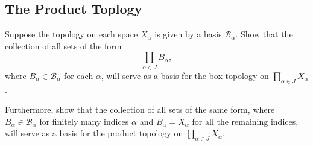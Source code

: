 \subsection{The Product Toplogy}

\begin{exercise}[ID=2.19.1]
    Suppose the topology on each space $X_\alpha$ is given by a basis $\mathscr{B}_\alpha$.
    Show that the collection of all sets of the form
    $$\prod_{\alpha \in J} B_\alpha,$$
    where $B_\alpha \in \mathscr{B}_\alpha$ for each $\alpha$, will serve as a basis for the box topology on $\prod_{\alpha \in J} X_\alpha$.

    Furthermore, show that the collection of all sets of the same form, where $B_\alpha \in \mathscr{B}_\alpha$ for finitely many indices $\alpha$ and $B_\alpha = X_\alpha$ for all the remaining indices, will serve as a basis for the product topology on $\prod_{\alpha \in J} X_\alpha$.
\end{exercise}

